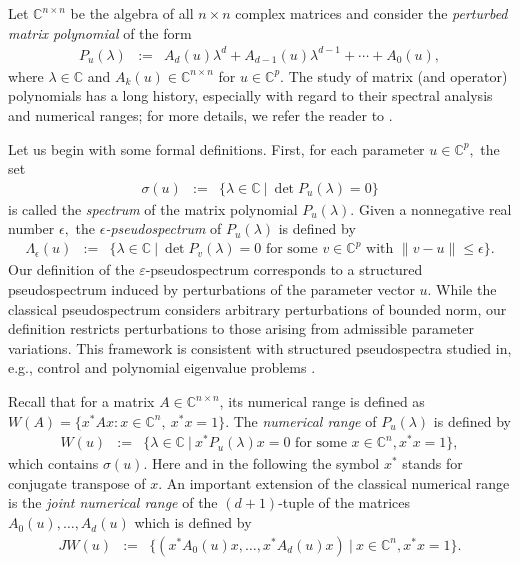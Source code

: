 \documentclass[10pt,reqno]{amsart}
\theoremstyle{break-italic}
\theoremstyle{break-italic}
\theoremstyle{break-italic}
\theoremstyle{break-italic}
\theoremstyle{break-italic}
\theoremstyle{break-italic}
\theoremstyle{break-italic}
\theoremstyle{break-italic}
\theoremstyle{break-roman}
\theoremstyle{standard}
\theoremstyle{varthm-roman}
\theoremstyle{varthm-italic}
\theoremstyle{varthm-roman-break}
\theoremstyle{varthm-italic-break}
\theoremstyle{varthm-roman-no-punctuation}
\theoremstyle{varthm-italic-no-punctuation}
\numberwithin{equation}{section}
\begin{document}
Let $\mathbb{C}^{n\times n}$ be the algebra of all $n \times n$ complex matrices and consider the \emph{perturbed matrix polynomial} of the form
\begin{eqnarray*}
P_{u}(\lambda) &:=& A_d(u)  \lambda^d  + A_{d - 1}(u) \lambda^{d - 1}  + \cdots + A_{0}(u),
\end{eqnarray*}
where $\lambda \in \mathbb{C}$  and $A_{k}(u) \in \mathbb{C}^{n\times n}$ for $u \in \mathbb{C}^p.$  The study of matrix (and operator) polynomials has a long history, especially with regard to their spectral analysis and numerical ranges; for more details, we refer the reader to \cite{Gantmacher1959, Gohberg1982, Lancaster1966, Markus1988}.

Let us begin with some formal definitions. First, for each parameter $u \in \mathbb{C}^p,$ the set
\begin{eqnarray*}
\sigma(u) &:=& \{ \lambda \in \mathbb{C} \ | \ \det P_{u}(\lambda) = 0\}
\end{eqnarray*}
is called the \emph{spectrum} of the matrix polynomial $P_u(\lambda)$. Given a nonnegative real number $\epsilon,$ the \emph{$\epsilon$-pseudospectrum} of $P_u(\lambda)$ is defined by
\begin{eqnarray*}
\Lambda_{\epsilon}(u) &:=& \{\lambda \in \mathbb C \ | \ \det P_{v}(\lambda)=0 \mbox{ for some } v \in \mathbb C^p \mbox{ with } \|v - u\|\leq \epsilon\}.
\end{eqnarray*}
Our definition of the $\varepsilon$-pseudospectrum corresponds to a structured  pseudospectrum induced by perturbations of the parameter vector $u$. While the classical pseudospectrum considers arbitrary perturbations of bounded  norm, our definition restricts perturbations to those arising from admissible parameter variations. This framework is consistent with structured pseudospectra studied in, e.g., control and polynomial eigenvalue problems \cite{Tisseur2001-1, Higham2003}.

Recall that for a matrix $A \in \mathbb{C}^{n \times n}$, its numerical range is defined as
$
W(A) = \{x^*Ax : x \in \mathbb{C}^n, \ x^*x = 1\}.
$
The \emph{numerical range} of $P_u(\lambda)$ is defined by
\begin{eqnarray*}
W(u) &:=& \{\lambda \in \mathbb{C} \ | \ x^*P_u(\lambda)x =0 \mbox{ for some }  x\in \mathbb C^n, x^*x=1\},
\end{eqnarray*}
which contains $\sigma(u).$ Here and in the following the symbol $x^*$ stands for conjugate transpose of $x.$ An important extension of the classical numerical range is the  \emph{joint numerical range} of the $(d + 1)$-tuple of the matrices $A_0(u), \ldots, A_{d}(u)$ which is defined by
\begin{eqnarray*}
JW(u) &:=& \{(x^* A_0(u) x, \ldots, x^*A_{d}(u)x) \ | \   x \in \mathbb{C}^n, x^*x=1\}.
\end{eqnarray*}
\end{document}
